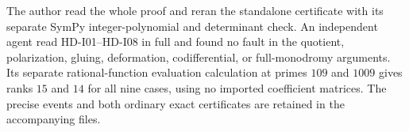 The author read the whole proof and reran the standalone certificate
with its separate SymPy integer-polynomial and determinant check.
An independent agent read HD-I01--HD-I08 in full and found no fault
in the quotient, polarization, gluing, deformation, codifferential,
or full-monodromy arguments. Its separate rational-function evaluation
calculation at primes $109$ and $1009$ gives ranks $15$ and $14$
for all nine cases, using no imported coefficient matrices.
The precise events and both ordinary exact certificates are retained
in the accompanying files.
